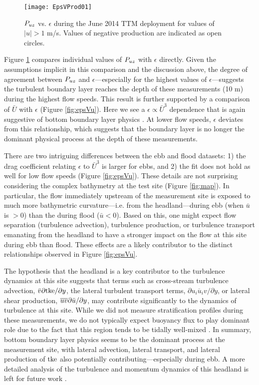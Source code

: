 \begin{figure}[t]
  \centering
  \texttt{[image: EpsVProd01]}
  \caption{$P_{uz}$ vs. $\epsilon$ during the June 2014 TTM deployment for values of $|u|>1$ m/s. Values of negative production are indicated as open circles. }
  \label{fig:prodVeps}
\end{figure}

Figure \ref{fig:prodVeps} compares individual values of $P_{uz}$ with $\epsilon$ directly. Given the assumptions implicit in this comparison and the discussion above, the degree of agreement between $P_{uz}$ and $\epsilon$---especially for the highest values of $\epsilon$---suggests the turbulent boundary layer reaches the depth of these measurements (10 m) during the highest flow speeds. This result is further supported by a comparison of $\bar{U}$ with $\epsilon$ (Figure \ref{fig:epsVu}). Here we see a $\epsilon \propto \bar{U}^3$ dependence that is again suggestive of bottom boundary layer physics \cite[]{Trowbridge1992,Nash++2009}. At lower flow speeds, $\epsilon$ deviates from this relationship, which suggests that the boundary layer is no longer the dominant physical process at the depth of these measurements.

There are two intriguing differences between the ebb and flood datasets: 1) the drag coefficient relating $\epsilon$ to $\bar{U}^3$ is larger for ebbs, and 2) the fit does not hold as well for low flow speeds (Figure \ref{fig:epsVu}). These details are not surprising considering the complex bathymetry at the test site (Figure \ref{fig:map}). In particular, the flow immediately upstream of the measurement site is exposed to much more bathymetric curvature---i.e. from the headland---during ebb (when $\bar{u}$ is $>0$) than the during flood ($\bar{u}<0$). Based on this, one might expect flow separation (turbulence advection), turbulence production, or turbulence transport emanating from the headland to have a stronger impact on the flow at this site during ebb than flood. These effects are a likely contributor to the distinct relationships observed in Figure \ref{fig:epsVu}. 

The hypothesis that the headland is a key contributor to the turbulence dynamics at this site suggests that terms such as cross-stream turbulence advection, $\bar{v}\partial \mathrm{tke} / \partial y$, the lateral turbulent transport terms, $\partial \overline{u_iu_i v} / \partial y$, or lateral shear production, $\overline{uv}\partial \bar{u} / \partial y$, may contribute significantly to the dynamics of turbulence at this site. While we did not measure stratification profiles during these measurements, we do not typically expect buoyancy flux to play dominant role due to the fact that this region tends to be tidally well-mixed \cite[]{Geyer+Cannon1982}. In summary, bottom boundary layer physics seems to be the dominant process at the measurement site, with lateral advection, lateral transport, and lateral production of $\mathrm{tke}$ also potentially contributing---especially during ebb. A more detailed analysis of the turbulence and momentum dynamics of this headland is left for future work \cite[e.g., ][]{Warner++2013}.

